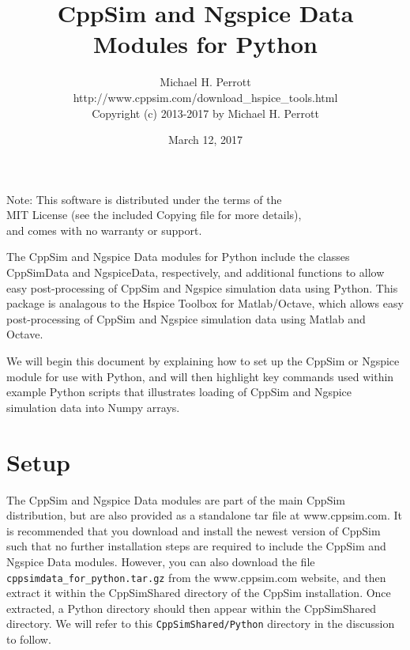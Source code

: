\documentclass [dvips,12pt]{article}
\begin{document}
\title{CppSim and Ngspice Data Modules for Python}
\author{Michael H. Perrott \\ http://www.cppsim.com/download\_hspice\_tools.html
\\ Copyright (c) 2013-2017 by Michael H. Perrott}
\date{March 12, 2017}
\maketitle

\vspace{-.3in}
\begin{center}
Note:  This software is distributed under the terms of the 
\\    MIT License (see the included Copying file for more details), 
\\    and comes with no warranty or support.
\end{center}

The CppSim and Ngspice Data modules for Python include the classes
CppSimData and NgspiceData, respectively, and additional functions to
allow easy post-processing of CppSim and Ngspice simulation data using
Python. This package is analagous to the Hspice Toolbox for
Matlab/Octave, which allows easy post-processing of CppSim and Ngspice
simulation data using Matlab and Octave.

We will begin this document by explaining how to set up the CppSim or
Ngspice module for use with Python, and will then highlight key
commands used within example Python scripts that illustrates loading
of CppSim and Ngspice simulation data into Numpy arrays.

\section*{Setup}

The CppSim and Ngspice Data modules are part of the main CppSim distribution, but
are also provided as a standalone tar file at www.cppsim.com.  It is recommended that
you download and install the newest version of CppSim such that
no further installation steps are required to include the CppSim and Ngspice
Data modules.  However, you can also download the file
\verb|cppsimdata_for_python.tar.gz| from the www.cppsim.com website, and
then extract it within the CppSimShared directory of the CppSim
installation. Once extracted, a Python directory should then appear
within the CppSimShared directory.  We will refer to this \verb|CppSimShared/Python|
directory in the discussion to follow.
\end{document}
